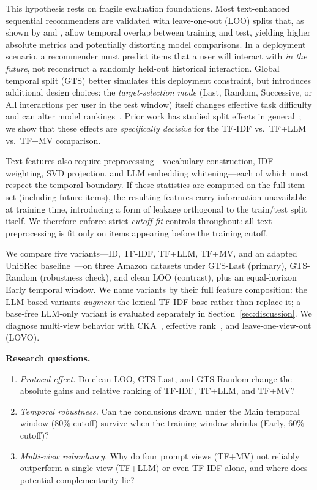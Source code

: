 \documentclass[sigconf,natbib=true,anonymous]{acmart}
\newcommand{\tfidf}{\textsc{TF-IDF}\xspace}
\newcommand{\llm}{\textsc{LLM}\xspace}
\newcommand{\tfllm}{\textsc{TF+LLM}\xspace}
\newcommand{\tfmv}{\textsc{TF+MV}\xspace}
\begin{document}
This hypothesis rests on fragile evaluation foundations.
Most text-enhanced sequential recommenders are validated with leave-one-out (LOO) splits that, as shown by \citet{ji2023evaluation} and \citet{sun2023reevaluation}, allow temporal overlap between training and test, yielding higher absolute metrics and potentially distorting model comparisons.
In a deployment scenario, a recommender must predict items that a user will interact with \emph{in the future}, not reconstruct a randomly held-out historical interaction.
Global temporal split (GTS) better simulates this deployment constraint, but introduces additional design choices: the \emph{target-selection mode} (Last, Random, Successive, or All interactions per user in the test window) itself changes effective task difficulty and can alter model rankings~\cite{gusak2025time}.
Prior work has studied split effects in general~\cite{meng2020temporal,ji2023evaluation}; we show that these effects are \emph{specifically decisive} for the \tfidf vs.\ \tfllm vs.\ \tfmv comparison.

Text features also require preprocessing---vocabulary construction, IDF weighting, SVD projection, and LLM embedding whit\-ening---each of which must respect the temporal boundary.
If these statistics are computed on the full item set (including future items), the resulting features carry information unavailable at training time, introducing a form of leakage orthogonal to the train/test split itself.
We therefore enforce strict \emph{cutoff-fit} controls throughout: all text preprocessing is fit only on items appearing before the training cutoff.

We compare five variants---ID, \tfidf, \tfllm, \tfmv, and an adapted UniSRec baseline~\cite{hou2022unisrec}---on three Amazon datasets under GTS-Last (primary), GTS-Random (robustness check), and clean LOO (contrast), plus an equal-horizon Early temporal window.
We name variants by their full feature composition: the \llm-based variants \emph{augment} the lexical \tfidf base rather than replace it; a base-free LLM-only variant is evaluated separately in Section~\ref{sec:discussion}.
We diagnose multi-view behavior with CKA~\cite{kornblith2019cka}, effective rank~\cite{roy2007effective}, and leave-one-view-out (LOVO).

\noindent\textbf{Research questions.}
\nopagebreak
\begin{enumerate}[leftmargin=*,itemsep=1pt,topsep=4pt]
\item[\textbf{RQ1}] \emph{Protocol effect.}
Do clean LOO, GTS-Last, and GTS-Random change the absolute gains and relative ranking of \tfidf, \tfllm, and \tfmv?
\item[\textbf{RQ2}] \emph{Temporal robustness.}
Can the conclusions drawn under the Main temporal window ($80\%$ cutoff) survive when the training window shrinks (Early, $60\%$ cutoff)?
\item[\textbf{RQ3}] \emph{Multi-view redundancy.}
Why do four prompt views (\tfmv) not reliably outperform a single view (\tfllm) or even \tfidf alone, and where does potential complementarity lie?
\end{enumerate}
\end{document}
